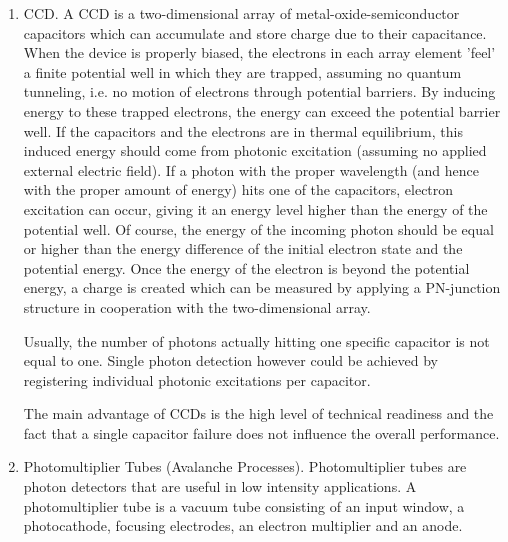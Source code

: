 \begin{enumerate}[i]
	\item \ac{CCD}. A \acs{CCD} is a two-dimensional array of metal-oxide-semiconductor capacitors which can accumulate and store charge due to their capacitance. When the device is properly biased, the electrons in each array element 'feel' a finite potential well in which they are trapped, assuming no quantum tunneling, i.e. no motion of electrons through potential barriers. By inducing energy to these trapped electrons, the energy can exceed the potential barrier well. If the capacitors and the electrons are in thermal equilibrium, this induced energy should come from photonic excitation (assuming no applied external electric field). If a photon with the proper wavelength (and hence with the proper amount of energy) hits one of the capacitors, electron excitation can occur, giving it an energy level higher than the energy of the potential well. Of course, the energy of the incoming photon should be equal or higher than the energy difference of the initial electron state and the potential energy. Once the energy of the electron is beyond the potential energy, a charge is created which can be measured by applying a PN-junction structure in cooperation with the two-dimensional array. 
	
Usually, the number of photons actually hitting one specific capacitor is not equal to one. Single photon detection however could be achieved by registering individual photonic excitations per capacitor. 

The main advantage of \acs{CCD}s is the high level of technical readiness and the fact that a single capacitor failure does not influence the overall performance.

\item Photomultiplier Tubes (Avalanche Processes). Photomultiplier tubes are photon detectors that are useful in low intensity applications. A photomultiplier tube is a vacuum tube consisting of an input window, a photocathode, focusing electrodes, an electron multiplier and an anode.


\end{enumerate}
